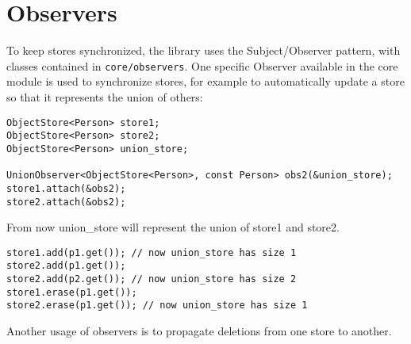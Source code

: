 \section{Observers}

To keep stores synchronized, the library uses the Subject/Observer pattern, with classes contained in \texttt{core/observers}. One specific Observer available in the core module is used to synchronize stores, for example to automatically update a store so that it represents the union of others:
\begin{lstlisting}[style=c++]
ObjectStore<Person> store1;
ObjectStore<Person> store2;
ObjectStore<Person> union_store;

UnionObserver<ObjectStore<Person>, const Person> obs2(&union_store);
store1.attach(&obs2);
store2.attach(&obs2);
\end{lstlisting} 
From now union\_store will represent the union of store1 and store2.
\begin{lstlisting}[style=c++]
store1.add(p1.get()); // now union_store has size 1
store2.add(p1.get());
store2.add(p2.get()); // now union_store has size 2
store1.erase(p1.get());
store2.erase(p1.get()); // now union_store has size 1
\end{lstlisting}
Another usage of observers is to propagate deletions from one store to another.